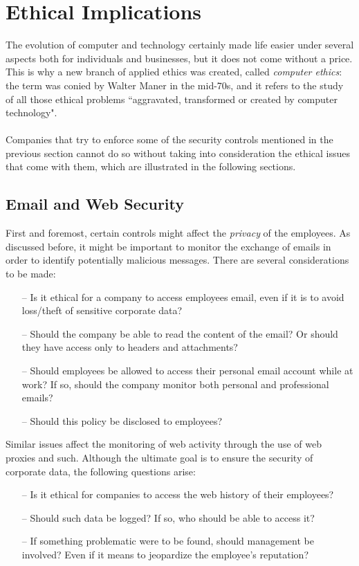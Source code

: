 \section{Ethical Implications}
	The evolution of computer and technology certainly made life easier under several aspects both for individuals and businesses, but it does not come without a price. This is why a new branch of applied ethics was created, called \textit{computer ethics}: the term was conied by Walter Maner in the mid-70s, and it refers to the study of all those ethical problems ``aggravated, transformed or created by computer 
	technology"\cite{cyberethics}.\\\\
	Companies that try to enforce some of the security controls mentioned in the previous section cannot do so without taking into consideration the ethical issues that come with them, which are illustrated in the following sections.
	\subsection{Email and Web Security}
	First and foremost, certain controls might affect the \textit{privacy} of the employees. As discussed before, it might be important to monitor the exchange of emails in order to identify potentially malicious messages. There are several considerations to be made:
	\begin{itemize}
		\item[--] Is it ethical for a company to access employees email, even if it is to avoid loss/theft of sensitive corporate data?
		\item[--] Should the company be able to read the content of the email? Or should they have access only to headers and attachments?
		\item[--] Should employees be allowed to access their personal email account while at work? If so, should the company monitor both personal and professional emails?
		\item[--] Should this policy be disclosed to employees? 
	\end{itemize}
	Similar issues affect the monitoring of web activity through the use of web proxies and such. Although the ultimate goal is to ensure the security of corporate data, the following questions arise:
	\begin{itemize}
		\item[--] Is it ethical for companies to access the web history of their employees?
		\item[--] Should such data be logged? If so, who should be able to access it?
		\item[--] If something problematic were to be found, should management be involved? Even if it means to jeopardize the employee's reputation?
	\end{itemize}
